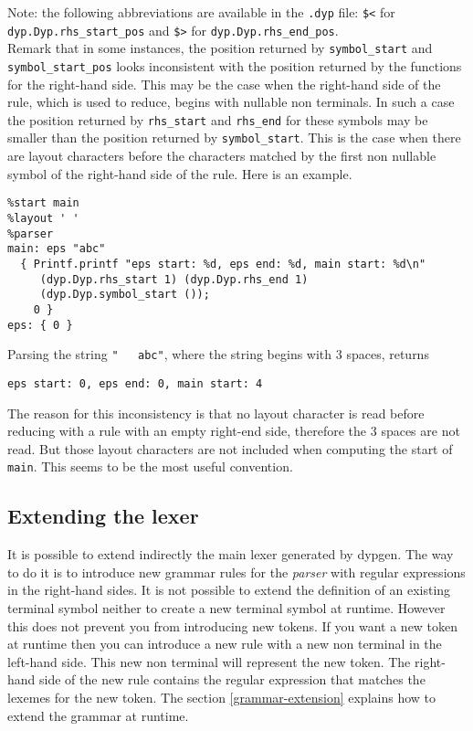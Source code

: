 \documentclass[12pt]{article}
\begin{document}
{Note: the following abbreviations are available in the \verb|.dyp| file: \verb|$<| for \verb|dyp.Dyp.rhs_start_pos| and \verb|$>| for \verb|dyp.Dyp.rhs_end_pos|.\\

Remark that in some instances, the position returned by \verb|symbol_start| and \verb|symbol_start_pos| looks inconsistent with the position returned by the functions for the right-hand side. This may be the case when the right-hand side of the rule, which is used to reduce, begins with nullable non terminals. In such a case the position returned by \verb|rhs_start| and \verb|rhs_end| for these symbols may be smaller than the position returned by \verb|symbol_start|. This is the case when there are layout characters before the characters matched by the first non nullable symbol of the right-hand side of the rule. Here is an example.
\begin{verbatim}
%start main
%layout ' '
%parser
main: eps "abc"
  { Printf.printf "eps start: %d, eps end: %d, main start: %d\n"
     (dyp.Dyp.rhs_start 1) (dyp.Dyp.rhs_end 1)
     (dyp.Dyp.symbol_start ());
    0 }
eps: { 0 }
\end{verbatim}
Parsing the string \verb|"   abc"|, where the string begins with 3 spaces, returns
\begin{verbatim}
eps start: 0, eps end: 0, main start: 4
\end{verbatim}
The reason for this inconsistency is that no layout character is read before reducing with a rule with an empty right-end side, therefore the 3 spaces are not read. But those layout characters are not included when computing the start of \verb|main|. This seems to be the most useful convention.


\subsection{Extending the lexer}

It is possible to extend indirectly the main lexer generated by dypgen. The way to do it is to introduce new grammar rules for the \emph{parser} with regular expressions in the right-hand sides. It is not possible to extend the definition of an existing terminal symbol neither to create a new terminal symbol at runtime. However this does not prevent you from introducing new tokens. If you want a new token at runtime then you can introduce a new rule with a new non terminal in the left-hand side. This new non terminal will represent the new token. The right-hand side of the new rule contains the regular expression that matches the lexemes for the new token. The section \ref{grammar-extension} explains how to extend the grammar at runtime.

}
\end{document}
